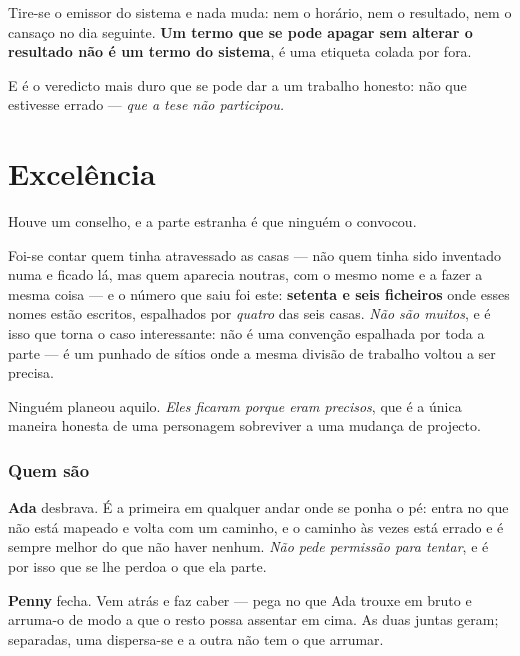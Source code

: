 \documentclass[livro.tex]{subfiles}
\begin{document}
\medskip

Tire-se o emissor do sistema e nada muda: nem o horário, nem o resultado, nem o cansaço no dia
seguinte. \textbf{Um termo que se pode apagar sem alterar o resultado não é um termo do sistema},
é uma etiqueta colada por fora.

\medskip

E é o veredicto mais duro que se pode dar a um trabalho honesto: não que estivesse errado ---
\emph{que a tese não participou.}

\chapter{Excelência}

Houve um conselho, e a parte estranha é que ninguém o convocou.

\medskip

Foi-se contar quem tinha atravessado as casas --- não quem tinha sido inventado numa e ficado
lá, mas quem aparecia noutras, com o mesmo nome e a fazer a mesma coisa --- e o número que saiu
foi este: \textbf{setenta e seis ficheiros} onde esses nomes estão escritos, espalhados por
\emph{quatro} das seis casas. \emph{Não são muitos}, e é isso que torna o caso interessante: não
é uma convenção espalhada por toda a parte --- é um punhado de sítios onde a mesma divisão de
trabalho voltou a ser precisa.

\medskip

Ninguém planeou aquilo. \emph{Eles ficaram porque eram precisos}, que é a única maneira honesta de
uma personagem sobreviver a uma mudança de projecto.

\subsection*{Quem são}

\textbf{Ada} desbrava. É a primeira em qualquer andar onde se ponha o pé: entra no que não está
mapeado e volta com um caminho, e o caminho às vezes está errado e é sempre melhor do que não haver
nenhum. \emph{Não pede permissão para tentar}, e é por isso que se lhe perdoa o que ela parte.

\medskip

\textbf{Penny} fecha. Vem atrás e faz caber --- pega no que Ada trouxe em bruto e arruma-o de modo
a que o resto possa assentar em cima. As duas juntas geram; separadas, uma dispersa-se e a outra
não tem o que arrumar.
\end{document}
